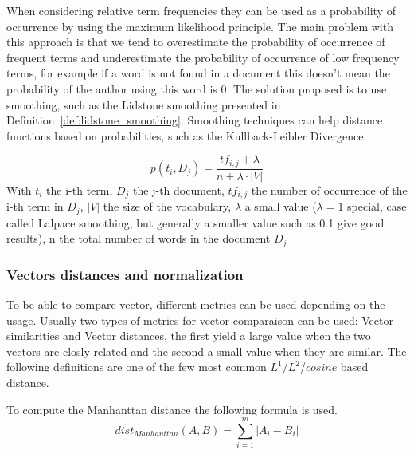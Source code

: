 When considering relative term frequencies they can be used as a probability of occurrence by using the maximum likelihood principle.
The main problem with this approach is that we tend to overestimate the probability of occurrence of frequent terms and underestimate the probability of occurrence of low frequency terms, for example if a word is not found in a document this doesn't mean the probability of the author using this word is 0.
The solution proposed is to use smoothing, such as the Lidstone smoothing presented in Definition~\ref{def:lidstone_smoothing}.
Smoothing techniques can help distance functions based on probabilities, such as the Kullback-Leibler Divergence.

\begin{definition}
  \label{def:lidstone_smoothing}
  \begin{equation}
    p(t_i, D_j) = \frac{tf_{i,j} + \lambda}{n + \lambda \cdot |V|}
  \end{equation}
  With $t_i$ the i-th term, $D_j$ the j-th document, $tf_{i,j}$ the number of occurrence of the i-th term in $D_j$, $|V|$ the size of the vocabulary, $\lambda$ a small value ($\lambda = 1$ special, case called Lalpace smoothing, but generally a smaller value such as 0.1 give good results), n the total number of words in the document $D_j$
\end{definition}

\subsubsection{Vectors distances and normalization}
\label{sec:fv_distances}

To be able to compare vector, different metrics can be used depending on the usage.
Usually two types of metrics for vector comparaison can be used: Vector similarities and Vector distances, the first yield a large value when the two vectors are closly related and the second a small value when they are similar.
The following definitions are one of the few most common $L^1$/$L^2$/$cosine$ based distance.

\begin{definition}
  To compute the Manhanttan distance the following formula is used.
  \begin{equation}
    dist_{Manhanttan}(A, B) = \sum_{i=1}^{m} |A_i - B_i|
  \end{equation}
\end{definition}

